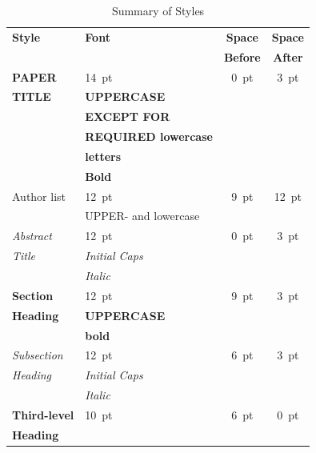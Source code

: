 \documentclass[letter,
               biblatex,     %
               keeplastbox,   %
               ]{jacow}
\begin{document}
  \begin{table}[h!b]
	\setlength\tabcolsep{3.5pt}
	\centering
	\caption{Summary of Styles}
	\label{tab:styles}
	\begin{tabular}{llcc}
		\toprule
		\textbf{Style} & \textbf{Font}               & \textbf{Space}  & \textbf{Space} \\
		&                             & \textbf{Before} & \textbf{After} \\
		\midrule
		\textbf{PAPER}  & \SI{14}{pt}                 & \SI{0}{pt}      & \SI{3}{pt}  \\
		\textbf{TITLE}  & \textbf{UPPERCASE}          &                 &      \\
		& \textbf{EXCEPT FOR}         &                 &      \\
		& \textbf{REQUIRED lowercase} &                 &      \\
		& \textbf{letters}            &                 &      \\
		& \textbf{Bold}               &                 &      \\[5pt]
		Author list  & \SI{12}{pt}                 & \SI{9}{pt}      & \SI{12}{pt} \\
		& UPPER- and lowercase        &                 &      \\[5pt]
		\textit{Abstract} & \SI{12}{pt}                 & \SI{0}{pt}      & \SI{3}{pt} \\
		\textit{Title}  & \textit{Initial Caps}       &                 &      \\
		& \textit{Italic}             &                 &      \\[5pt]
		\textbf{Section}  & \SI{12}{pt}                 & \SI{9}{pt}      & \SI{3}{pt}  \\
		\textbf{Heading}  & \textbf{UPPERCASE}          &                 &      \\
		& \textbf{bold}               &                 &      \\[5pt]
		\textit{Subsection} & \SI{12}{pt}                 & \SI{6}{pt}      & \SI{3}{pt}  \\
		\textit{Heading}
                             & \textit{Initial Caps}       &                 &      \\
		& \textit{Italic}             &                 &      \\[5pt]
		\textbf{Third-level} & \SI{10}{pt}                 & \SI{6}{pt}      & \SI{0}{pt}  \\
		\textbf{Heading}     

\end{tabular}
\end{table}
\end{document}
